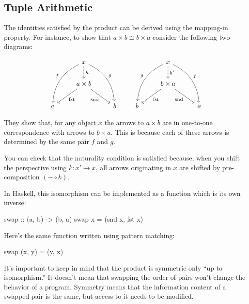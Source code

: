 \documentclass[DaoFP]{subfiles}
\begin{document}
\subsection{Tuple Arithmetic}

The identities satisfied by the product can be derived using the mapping-in property. For instance, to show that $a \times b \cong b \times a$ consider the following two diagrams:

\[
 \begin{tikzcd}
 &x
 \arrow[d, dashed, "h"]
 \arrow[ddl, bend right, "f"']
 \arrow[ddr, bend left, "g"]
 \\
 & a \times b
  \arrow[dl,  "\text{fst}"]
 \arrow[dr,   "\text{snd}"']
 \\
a && b
 \end{tikzcd}
 \qquad
 \begin{tikzcd}
 &x
 \arrow[d, dashed, "h'"]
 \arrow[ddl, bend right, "g"']
 \arrow[ddr, bend left, "f"]
 \\
 & b \times a
  \arrow[dl,  "\text{fst}"]
 \arrow[dr,   "\text{snd}"']
\\
b && a
  \end{tikzcd}
\]

They show that, for any object $x$ the arrows to $a \times b$ are in one-to-one correspondence with arrows to $b \times a$. This is because each of these arrows is determined by the same pair $f$ and $g$. 

You can check that the naturality condition is satisfied because, when you shift the perspective using $k \colon x' \to x$, all arrows originating in $x$ are shifted by pre-composition $(- \circ k)$.

In Haskell, this isomorphism can be implemented as a function which is its own inverse:
\begin{haskell}
swap :: (a, b) -> (b, a)
swap x = (snd x, fst x)
\end{haskell}
Here's the same function written using pattern matching:
\begin{haskell}
swap (x, y) = (y, x)
\end{haskell}

It's important to keep in mind that the product is symmetric only ``up to isomorphism.'' It doesn't mean that swapping the order of pairs won't change the behavior of a program. Symmetry means that the information content of a swapped pair is the same, but access to it needs to be modified.
\end{document}
